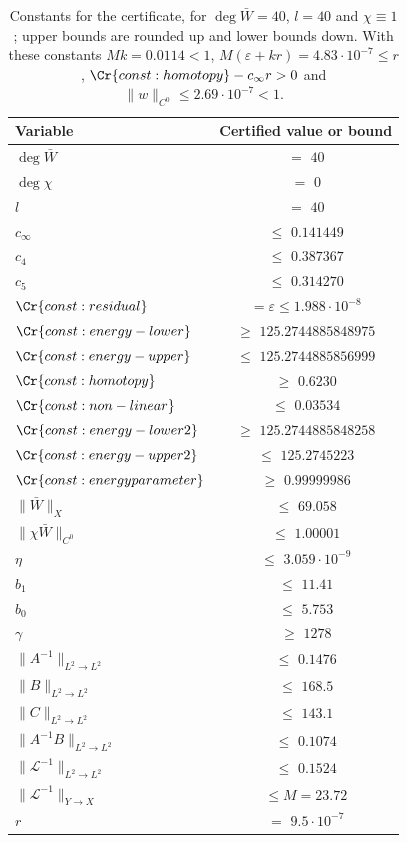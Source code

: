 \begin{table}[H]
\centering
\begin{tabular}{lc}
\toprule
Variable & Certified value or bound\\
\midrule
$\deg\bar W$ & $=$ $40$\\
$\deg\chi$ & $=$ $0$\\
$l$ & $=$ $40$\\
$c_\infty$ & $\le$ $0.141449$\\
$c_4$ & $\le$ $0.387367$\\
$c_5$ & $\le$ $0.314270$\\
$\Cr{const:residual}$ & $=\varepsilon\le 1.988\cdot 10^{-8}$\\
$\Cr{const:energy-lower}$ & $\ge$ $125.2744885848975$\\
$\Cr{const:energy-upper}$ & $\le$ $125.2744885856999$\\
$\Cr{const:homotopy}$ & $\ge$ $0.6230$\\
$\Cr{const:non-linear}$ & $\le$ $0.03534$\\
$\Cr{const:energy-lower2}$ & $\ge$ $125.2744885848258$\\
$\Cr{const:energy-upper2}$ & $\le$ $125.2745223$\\
$\Cr{const:energyparameter}$ & $\ge$ $0.99999986$\\
$\|\bar W\|_X$ & $\le$ $69.058$\\
$\|\chi\bar W\|_{C^0}$ & $\le$ $1.00001$\\
$\eta$ & $\le$ $3.059\cdot 10^{-9}$\\
$b_1$ & $\le$ $11.41$\\
$b_0$ & $\le$ $5.753$\\
$\gamma$ & $\ge$ $1278$\\
$\|A^{-1}\|_{L^2\to L^2}$ & $\le$ $0.1476$\\
$\|B\|_{L^2\to L^2}$ & $\le$ $168.5$\\
$\|C\|_{L^2\to L^2}$ & $\le$ $143.1$\\
$\|A^{-1}B\|_{L^2\to L^2}$ & $\le$ $0.1074$\\
$\|\mathscr L^{-1}\|_{L^2\to L^2}$ & $\le$ $0.1524$\\
$\|\mathscr L^{-1}\|_{Y\to X}$ & $\le M=23.72$\\
$r$ & $=$ $9.5\cdot 10^{-7}$\\
\bottomrule
\end{tabular}
\caption{Constants for the certificate, for $\deg\bar W=40$, $l=40$ and $\chi\equiv 1$; upper bounds are rounded up and lower bounds down. With these constants $Mk=0.0114<1$, $M(\varepsilon+kr)=4.83\cdot 10^{-7}\le r$, $\Cr{const:homotopy}-c_\infty r>0$ and $\|w\|_{C^0}\le2.69\cdot 10^{-7}<1$.}
\label{master-table}
\end{table}
